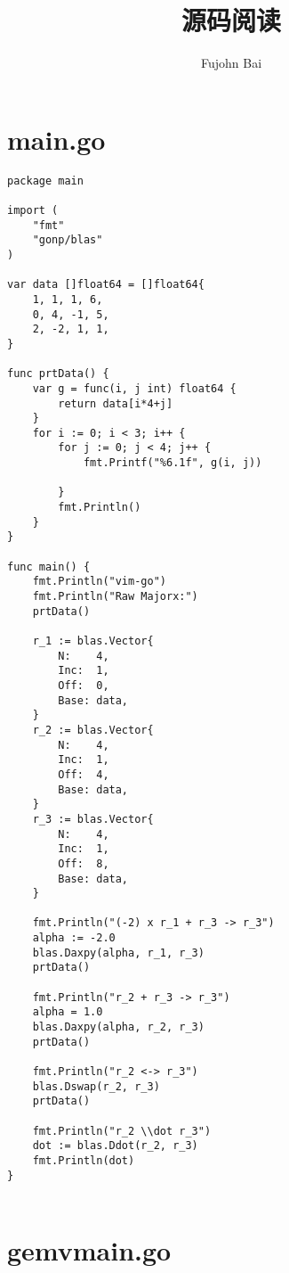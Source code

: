 \documentclass[a6paper,titlepage,landscape,oneside,12pt]{book}
\title{源码阅读}
\author{Fujohn Bai}
\begin{document}
\maketitle

\lstset{
	tabsize=2,
	breaklines=true
}

\chapter{main.go}

\begin{lstlisting}
package main

import (
	"fmt"
	"gonp/blas"
)

var data []float64 = []float64{
	1, 1, 1, 6,
	0, 4, -1, 5,
	2, -2, 1, 1,
}

func prtData() {
	var g = func(i, j int) float64 {
		return data[i*4+j]
	}
	for i := 0; i < 3; i++ {
		for j := 0; j < 4; j++ {
			fmt.Printf("%6.1f", g(i, j))

		}
		fmt.Println()
	}
}

func main() {
	fmt.Println("vim-go")
	fmt.Println("Raw Majorx:")
	prtData()

	r_1 := blas.Vector{
		N:    4,
		Inc:  1,
		Off:  0,
		Base: data,
	}
	r_2 := blas.Vector{
		N:    4,
		Inc:  1,
		Off:  4,
		Base: data,
	}
	r_3 := blas.Vector{
		N:    4,
		Inc:  1,
		Off:  8,
		Base: data,
	}

	fmt.Println("(-2) x r_1 + r_3 -> r_3")
	alpha := -2.0
	blas.Daxpy(alpha, r_1, r_3)
	prtData()

	fmt.Println("r_2 + r_3 -> r_3")
	alpha = 1.0
	blas.Daxpy(alpha, r_2, r_3)
	prtData()

	fmt.Println("r_2 <-> r_3")
	blas.Dswap(r_2, r_3)
	prtData()

	fmt.Println("r_2 \\dot r_3")
	dot := blas.Ddot(r_2, r_3)
	fmt.Println(dot)
}


\end{lstlisting}

\chapter{gemvmain.go}
\end{document}
